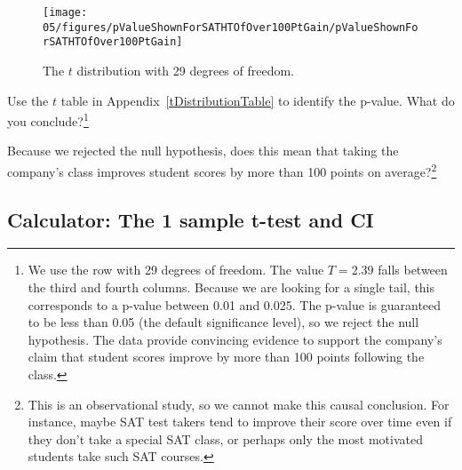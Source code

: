 \begin{figure}
\centering
\texttt{[image: 05/figures/pValueShownForSATHTOfOver100PtGain/pValueShownForSATHTOfOver100PtGain]}
\caption{The $t$ distribution with 29 degrees of freedom.}
\label{pValueShownForSATHTOfOver100PtGain}
\end{figure}

\textB{\pagebreak}

\begin{exercise}
Use the $t$ table in Appendix~\vref{tDistributionTable} to identify the p-value. What do you conclude?\footnote{We use the row with 29 degrees of freedom. The value $T=2.39$ falls between the third and fourth columns. Because we are looking for a single tail, this corresponds to a p-value between 0.01 and 0.025. The p-value is guaranteed to be less than 0.05 (the default significance level), so we reject the null hypothesis. The data provide convincing evidence to support the company's claim that student scores improve by more than 100 points following the class.}
\end{exercise}

\begin{exercise}
Because we rejected the null hypothesis, does this mean that taking the company's class improves student scores by more than 100 points on average?\footnote{This is an observational study, so we cannot make this causal conclusion. For instance, maybe SAT test takers tend to improve their score over time even if they don't take a special SAT class, or perhaps only the most motivated students take such SAT courses.}


\end{exercise}

\subsection{Calculator: The 1 sample t-test and CI}

